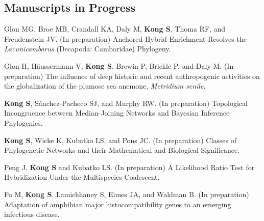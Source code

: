 \documentclass[11pt]{article}
\begin{document}
\subsection*{Manuscripts in Progress}
\begin{etaremune}


	\item Glon MG, Broe MB, Crandall KA, Daly M, \textbf{Kong S}, Thoma RF, and Freudenstein JV. (In preparation) Anchored Hybrid Enrichment Resolves the \textit{Lacunicambarus} (Decapoda: Cambaridae) Phylogeny.
	\item Glon H, Häussermann V, \textbf{Kong S}, Brewin P, Brickle P, and Daly M. (In preparation) The influence of deep historic and recent anthropogenic activities on the globalization of the plumose sea anemone, \textit{Metridium senile}.
	\item \textbf{Kong S}, Sánchez-Pacheco SJ, and Murphy RW. (In preparation) Topological Incongruence between Median-Joining Networks and Bayesian Inference Phylogenies.
	\item \textbf{Kong S}, Wicke K, Kubatko LS, and Pons JC. (In preparation) Classes of Phylogenetic Networks and their Mathematical and Biological Significance.
	\item Peng J, \textbf{Kong S} and Kubatko LS. (In preparation) A Likelihood Ratio Test for Hybridization Under the Multispecies Coalescent.
	\item Fu M, \textbf{Kong S}, Lamichhaney S, Eimes JA, and Waldman B. (In preparation) Adaptation of amphibian major histocompatibility genes to an emerging infectious disease.
\end{etaremune}
\end{document}
